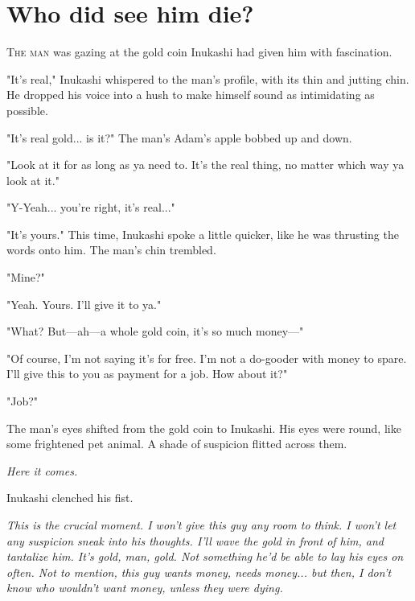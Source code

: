 
\chapter{Who did see him die?}


\lettrine{T}{he man} was gazing at the gold coin Inukashi had given him with
fascination.

"It's real," Inukashi whispered to the man's profile, with its thin and
jutting chin. He dropped his voice into a hush to make himself sound as
intimidating as possible.

"It's real gold... is it?" The man's Adam's apple bobbed up and down.

"Look at it for as long as ya need to. It's the real thing, no matter
which way ya look at it."

"Y-Yeah... you're right, it's real..."

"It's yours." This time, Inukashi spoke a little quicker, like he was
thrusting the words onto him. The man's chin trembled.

"Mine?"

"Yeah. Yours. I'll give it to ya."

"What? But---ah---a whole gold coin, it's so much money---"

"Of course, I'm not saying it's for free. I'm not a do-gooder with money
to spare. I'll give this to you as payment for a job. How about it?"

"Job?"

The man's eyes shifted from the gold coin to Inukashi. His eyes were
round, like some frightened pet animal. A shade of suspicion flitted
across them.

\emph{Here it comes.}

Inukashi clenched his fist.

\emph{This is the crucial moment. I won't give this guy any room to think. I
won't let any suspicion sneak into his thoughts. I'll wave the gold in
front of him, and tantalize him. It's gold, man, gold. Not something
he'd be able to lay his eyes on often. Not to mention, this guy wants
money, \emph{needs} money... but then, I don't know who \emph{wouldn't} want money,
unless they were dying.}

